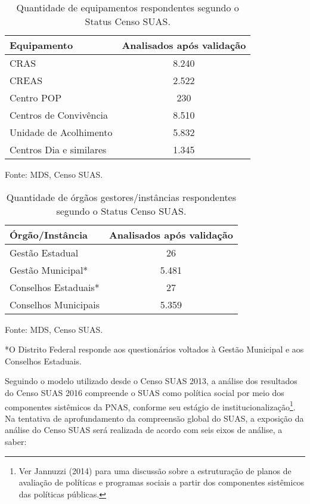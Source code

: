 \documentclass[brazilian]{report}
\newcommand\fnote[1]{\captionsetup{font=small, textfont=normalfont}\caption*{#1}}
\begin{document}
\begin{table}[]
\centering
\caption{Quantidade de equipamentos respondentes segundo o Status Censo SUAS.}
\label{tab:qtd_equipamentos}
\begin{tabular}{@{}lc@{}}
\toprule
Equipamento             & Analisados após validação \\ \midrule
CRAS                    & 8.240                     \\
CREAS                   & 2.522                     \\
Centro POP              & 230                       \\
Centros de Convivência  & 8.510                     \\
Unidade de Acolhimento  & 5.832                     \\
Centros Dia e similares & 1.345                     \\ \bottomrule
\end{tabular}
\fnote{Fonte: MDS, Censo SUAS.}
\end{table}

\begin{table}[]
\centering
\caption{Quantidade de órgãos gestores/instâncias respondentes segundo o Status Censo SUAS.}
\label{tab:qtd_orgaos}
\begin{tabular}{@{}lc@{}}
\toprule
Órgão/Instância      & Analisados após validação \\ \midrule
Gestão Estadual      & 26                        \\
Gestão Municipal*    & 5.481                     \\
Conselhos Estaduais* & 27                        \\
Conselhos Municipais & 5.359                     \\ \bottomrule
\end{tabular}
\fnote{Fonte: MDS, Censo SUAS.}
\fnote{*O Distrito Federal responde aos questionários voltados à Gestão Municipal e aos Conselhos Estaduais.}
\end{table}

Seguindo o modelo utilizado desde o Censo SUAS 2013, a análise dos resultados do Censo SUAS 2016 compreende o SUAS como política social por meio dos componentes sistêmicos da PNAS, conforme seu estágio de institucionalização\footnote{Ver Jannuzzi (2014) para uma discussão sobre a estruturação de planos de avaliação de políticas e programas sociais a partir dos componentes sistêmicos das políticas públicas.}. Na tentativa de aprofundamento da compreensão global do SUAS, a exposição da análise do Censo SUAS será realizada de acordo com seis eixos de análise, a saber:
\end{document}
